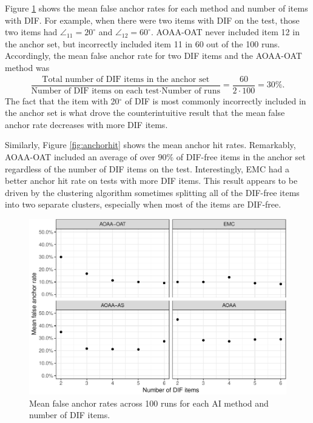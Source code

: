 \documentclass[
  11pt,
]{article}
\begin{document}
Figure \ref{fig:anchorfalse} shows the mean false anchor rates for each method and number of items with DIF. For example, when there were two items with DIF on the test, those two items had \(\angle_{11} = 20^\circ\) and \(\angle_{12} = 60^\circ\). AOAA-OAT never included item 12 in the anchor set, but incorrectly included item 11 in 60 out of the 100 runs. Accordingly, the mean false anchor rate for two DIF items and the AOAA-OAT method was
\begin{align}
\dfrac{\text{Total number of DIF items in the anchor set}}{\text{Number of DIF items on each test} \cdot \text{Number of runs}} = \dfrac{60}{2 \cdot 100} = 30\%.
\end{align}
The fact that the item with 20\(^\circ\) of DIF is most commonly incorrectly included in the anchor set is what drove the counterintuitive result that the mean false anchor rate decreases with more DIF items.

Similarly, Figure \ref{fig:anchorhit} shows the mean anchor hit rates. Remarkably, AOAA-OAT included an average of over \(90\%\) of DIF-free items in the anchor set regardless of the number of DIF items on the test. Interestingly, EMC had a better anchor hit rate on tests with more DIF items. This result appears to be driven by the clustering algorithm sometimes splitting all of the DIF-free items into two separate clusters, especially when most of the items are DIF-free.

\begin{figure}[H]

{\centering \includegraphics[width=0.7\linewidth]{paper_files/figure-latex/anchorfalse-1} 

}

\caption{Mean false anchor rates across 100 runs for each AI method and number of DIF items.}\label{fig:anchorfalse}
\end{figure}
\end{document}
